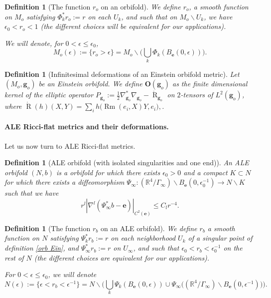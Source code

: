 \documentclass[12pt]{article}
\newtheorem{defn}[thm]{Definition}
\DeclareMathOperator{\Rm}{\operatorname{Rm}}
\DeclareMathOperator{\R}{\operatorname{R}}
\begin{document}
\begin{defn}[The function $r_o$ on an orbifold]\label{ro}
    We define $r_o$, a smooth function on $M_o$ satisfying $\Phi_k^*r_o:=  r$ on each $U_k$, and such that on $M_o\backslash U_k$, we have $\epsilon_0<r_o<1$ (the different choices will be equivalent for our applications).
    
    We will denote, for $0<\epsilon\leqslant\epsilon_0$, $$M_o(\epsilon):= \{r_o>\epsilon\} = M_o\backslash  \Big(\bigcup_k \Phi_k(B_\mathbf{e}(0,\epsilon)) \Big).$$
\end{defn}

\begin{defn}[Infinitesimal deformations of an Einstein orbifold metric]
    Let $(M_o,\mathbf{g}_o)$ be an Einstein orbifold. We define $\mathbf{O}(\mathbf{g}_o)$ as the finite dimensional kernel of the elliptic operator $P_{\mathbf{g}_o}:= \frac{1}{2}\nabla^*_{\mathbf{g}_o}\nabla_{\mathbf{g}_o}- \mathring{\R}_{\mathbf{g}_o}$ on $2$-tensors of $L^2(\mathbf{g}_o)$, where  $\mathring{\R}(h)(X,Y)= \sum_i h\big(\Rm(e_i,X)Y,e_i\big),$.
\end{defn}

\paragraph{ALE Ricci-flat metrics and their deformations.}

Let us now turn to ALE Ricci-flat metrics.

\begin{defn}[ALE orbifold (with isolated singularities and one end)]\label{def orb ale}
    An ALE orbifold $(N,b)$ is a orbifold for which there exists $\epsilon_0>0$ and a compact $K\subset N$ for which there exists a diffeomorphism $\Psi_\infty: (\mathbb{R}^4\slash\Gamma_\infty)\backslash B_\mathbf{e}(0,\epsilon_0^{-1}) \to N\backslash K$ such that we have $$r^l|\nabla^l(\Psi_\infty^* b - \mathbf{e})|_{C^2(\mathbf{e})}\leqslant C_l r^{-4}.$$
\end{defn}


\begin{defn}[The function $r_{b}$ on an ALE orbifold]
We define $r_{b}$ a smooth function on $N$ satisfying $\Psi_k^*r_{b}:=  r$ on each neighborhood $U_k$ of a singular point of definition \ref{orb Ein}, and $ \Psi_\infty^* r_{b}:=r$ on $U_\infty$, and such that $\epsilon_0<r_{b}<\epsilon_0^{-1}$ on the rest of $N$ (the different choices are equivalent for our applications).

For $0<\epsilon\leqslant\epsilon_0$, we will denote $$N(\epsilon):= \{\epsilon<r_b<\epsilon^{-1}\} = N\backslash  \Big(\bigcup_k \Psi_k(B_\mathbf{e}(0,\epsilon)) \cup \Psi_\infty \big((\mathbb{R}^4\slash\Gamma_\infty)\backslash B_\mathbf{e}(0,\epsilon^{-1})\big)\Big).$$
\end{defn}
\end{document}
